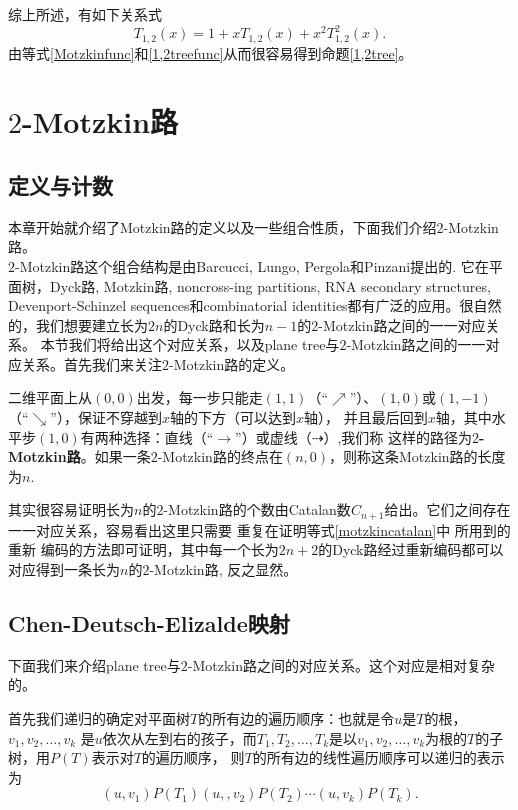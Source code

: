综上所述，有如下关系式
\begin{equation}
\label{1,2treefunc}
T_{1,2}(x)=1+xT_{1,2}(x)+x^2T_{1,2}^2(x).
\end{equation}
由等式\ref{Motzkinfunc}和\ref{1,2treefunc}从而很容易得到命题\ref{1,2tree}。

\section{$2$-Motzkin路}
\subsection{定义与计数}
本章开始就介绍了Motzkin路的定义以及一些组合性质，下面我们介绍$2$-Motzkin路。\\$2$-Motzkin路这个组合结构是由Barcucci, Lungo, Pergola和Pinzani提出的. 它在平面树，Dyck路, Motzkin路, noncross-ing partitions, RNA secondary structures, Devenport-Schinzel sequences和combinatorial
identities都有广泛的应用。很自然的，我们想要建立长为$2n$的Dyck路和长为$n-1$的$2$-Motzkin路之间的一一对应关系。
本节我们将给出这个对应关系，以及plane tree与$2$-Motzkin路之间的一一对应关系。首先我们来关注$2$-Motzkin路的定义。
\begin{defi}
二维平面上从$(0,0)$出发，每一步只能走$(1,1)$（“$\nearrow$”）、$(1,0)$或$(1,-1)$
（“$\searrow$”），保证不穿越到$x$轴的下方（可以达到$x$轴），
并且最后回到$x$轴，其中水平步$(1,0)$有两种选择：直线（“$\longrightarrow$”）或虚线（$\dashrightarrow$）,我们称
这样的路径为{\bf$2$-Motzkin路}。如果一条$2$-Motzkin路的终点在$(n,0)$，则称这条Motzkin路的长度为$n$. \end{defi}

其实很容易证明长为$n$的$2$-Motzkin路的个数由Catalan数$C_{n+1}$给出。它们之间存在一一对应关系，容易看出这里只需要
重复在证明等式\eqref{motzkincatalan}中
所用到的重新
编码的方法即可证明，其中每一个长为$2n+2$的Dyck路经过重新编码都可以对应得到一条长为$n$的$2$-Motzkin路, 反之显然。
\subsection{Chen-Deutsch-Elizalde映射}
下面我们来介绍plane tree与$2$-Motzkin路之间的对应关系。这个对应是相对复杂的。

首先我们递归的确定对平面树$T$的所有边的遍历顺序：也就是令$u$是$T$的根，$v_1,v_2,\ldots,v_k$
是$u$依次从左到右的孩子，而$T_1,T_2,\ldots,T_k$是以$v_1,v_2,\ldots,v_k$为根的$T$的子树，用$P(T)$表示对$T$的遍历顺序，
则$T$的所有边的线性遍历顺序可以递归的表示为$$(u,v_1)P(T_1)(u,,v_2)P(T_2)\cdots(u,v_k)P(T_k).$$

